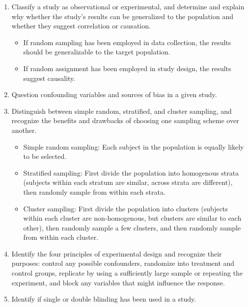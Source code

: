\documentclass[11pt]{article}
\begin{document}
\begin{enumerate}[resume]
\renewcommand\labelenumi{\textcolor{light}{\textbf{LO \theenumi.}}}
\item Classify a study as observational or experimental, and determine and explain why whether the study's results can be generalized to the population and whether they suggest correlation or causation.
\begin{itemize}
\renewcommand{\labelitemi}{{\textcolor{dark}{{\tiny $\blacksquare$}}}}
\item If random sampling has been employed in data collection, the results should be generalizable to the target population.
\item If random assignment has been employed in study design, the results suggest causality.
\end{itemize}
\item Question confounding variables and sources of bias in a given study.
\item Distinguish between simple random, stratified, and cluster sampling, and recognize the benefits and drawbacks of choosing one sampling scheme over another.
\begin{itemize}
\renewcommand{\labelitemi}{{\textcolor{dark}{{\tiny $\blacksquare$}}}}
\item Simple random sampling: Each subject in the population is equally likely to be selected.
\item Stratified sampling: First divide the population into homogenous strata (subjects within each stratum are similar, across strata are different), then randomly sample from within each strata.
\item Cluster sampling: First divide the population into clusters (subjects within each cluster are non-homogenous, but clusters are similar to each other), then randomly sample a few clusters, and then randomly sample from within each cluster.
\end{itemize}
\item Identify the four principles of experimental design and recognize their purposes: control any possible confounders, randomize into treatment and control groups, replicate by using a sufficiently large sample or repeating the experiment, and block any variables that might influence the response.
\item Identify if single or double blinding has been used in a study.
\end{enumerate}
\end{document}
